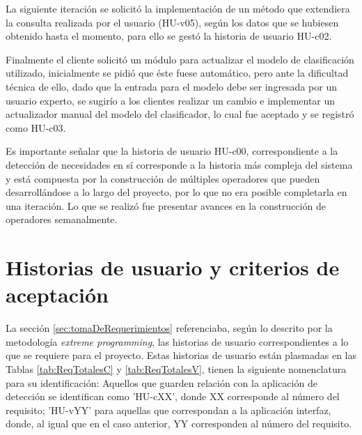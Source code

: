 La siguiente iteración se solicitó la implementación de un método que extendiera la consulta realizada por el usuario (HU-v05), según los datos que se hubiesen obtenido hasta el momento, para ello se gestó la historia de usuario HU-c02.

Finalmente el cliente solicitó un módulo para actualizar el modelo de clasificación utilizado, inicialmente se pidió que éste fuese automático, pero ante la dificultad técnica de ello, dado que la entrada para el modelo debe ser ingresada por un usuario experto, se sugirío a los clientes realizar un cambio e implementar un actualizador manual del modelo del clasificador, lo cual fue aceptado y se registró como HU-c03.

Es importante señalar que la historia de usuario HU-c00, correspondiente a la detección de necesidades en sí corresponde a la historia más compleja del sistema y está compuesta por la construcción de múltiples operadores que pueden desarrollándose a lo largo del proyecto, por lo que no era posible completarla en una iteración. Lo que se realizó fue presentar avances en la construcción de operadores semanalmente.

\section{Historias de usuario y criterios de aceptación}
\label{sec:historias}

La sección \ref{sec:tomaDeRequerimientos} referenciaba, según lo descrito por la metodología \textit{extreme programming}, las historias de usuario correspondientes a lo que se requiere para el proyecto. Estas historias de usuario están plasmadas en las Tablas \ref{tab:ReqTotalesC} y \ref{tab:ReqTotalesV}, tienen la siguiente nomenclatura para su identificación: Aquellos que guarden relación con la aplicación de detección se identifican como 'HU-cXX', donde XX corresponde al número del requisito; 'HU-vYY' para aquellas que correspondan a la aplicación interfaz, donde, al igual que en el caso anterior, YY corresponden al número del requisito.

